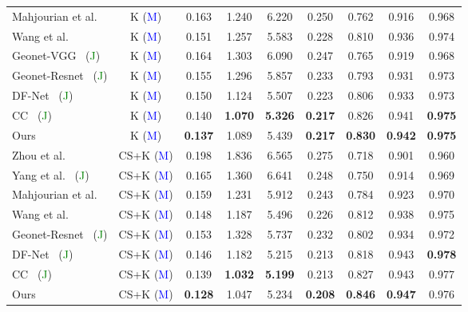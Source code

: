 \documentclass{article}
\def\etal{et al.}
\begin{document}
\begin{table}[!t]
{\begin{tabular}{l c| c c c c | c c c}
     Mahjourian \etal~\cite{mahjourian2018unsupervised} & K (\textcolor{blue}{M}) & 0.163 & 1.240 & 6.220 & 0.250 & 0.762 & 0.916 & 0.968 \\
     Wang
     \etal~\cite{Wang2018CVPR} & K (\textcolor{blue}{M}) & 0.151 & 1.257 & 5.583 & 0.228 & 0.810 & 0.936 & 0.974 \\
     Geonet-VGG~\cite{yin2018geonet} (\textcolor{green}{J}) & K (\textcolor{blue}{M}) & 0.164 & 1.303 & 6.090 & 0.247 & 0.765 & 0.919 & 0.968 \\
     Geonet-Resnet~\cite{yin2018geonet} (\textcolor{green}{J}) & K (\textcolor{blue}{M}) & 0.155 & 1.296 & 5.857 & 0.233 & 0.793 & 0.931 & 0.973\\
DF-Net~\cite{zou2018df} (\textcolor{green}{J}) & K (\textcolor{blue}{M}) & 0.150 & 1.124 & 5.507 & 0.223 & 0.806 & 0.933 & 0.973\\
     CC~\cite{ranjan2019cc} (\textcolor{green}{J}) & K (\textcolor{blue}{M}) & 0.140 & \textbf{1.070} & \textbf{5.326} & \textbf{0.217} & 0.826 & 0.941 & \textbf{0.975}\\
     Ours & K (\textcolor{blue}{M}) & \textbf{0.137} & 1.089 & 5.439 & \textbf{0.217} & \textbf{0.830} & \textbf{0.942} & \textbf{0.975}\\
     \hline
     Zhou \etal~\cite{zhou2017unsupervised} & CS+K (\textcolor{blue}{M}) & 0.198 & 1.836 & 6.565 & 0.275 & 0.718 & 0.901 & 0.960 \\
     Yang \etal~\cite{yang2018unsupervised} (\textcolor{green}{J}) & CS+K (\textcolor{blue}{M}) & 0.165 & 1.360 & 6.641 & 0.248 & 0.750 & 0.914 & 0.969 \\
     Mahjourian \etal~\cite{mahjourian2018unsupervised} & CS+K (\textcolor{blue}{M}) & 0.159 & 1.231 & 5.912 & 0.243 & 0.784 & 0.923 & 0.970 \\
     Wang
     \etal~\cite{Wang2018CVPR} & CS+K (\textcolor{blue}{M}) & 0.148 & 1.187 & 5.496 & 0.226 & 0.812 & 0.938 & 0.975 \\
     Geonet-Resnet~\cite{yin2018geonet} (\textcolor{green}{J}) & CS+K (\textcolor{blue}{M}) & 0.153 & 1.328 & 5.737 & 0.232 & 0.802 & 0.934 & 0.972 \\
     DF-Net~\cite{zou2018df} (\textcolor{green}{J}) & CS+K (\textcolor{blue}{M}) & 0.146 & 1.182 & 5.215 & 0.213 & 0.818 & 0.943 & \textbf{0.978} \\
     CC~\cite{ranjan2019cc} (\textcolor{green}{J}) & CS+K (\textcolor{blue}{M}) & 0.139 & \textbf{1.032} & \textbf{5.199} & 0.213 & 0.827 & 0.943 & 0.977 \\
     Ours & CS+K (\textcolor{blue}{M}) & \textbf{0.128} & 1.047 & 5.234 & \textbf{0.208} & \textbf{0.846} & \textbf{0.947} & 0.976 \\
    \toprule[2pt]
    \end{tabular}
    }
\end{table}
\end{document}
